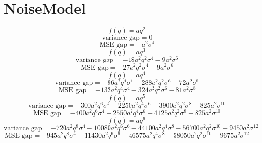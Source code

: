 \documentclass{article}
\begin{document}
\section*{NoiseModel}
\begin{dmath*}
f(q) = a q^{2}
\end{dmath*}
\begin{dmath*}
\text{variance gap} = 0
\end{dmath*}
\begin{dmath*}
\text{MSE gap} = - a^{2} \sigma^{4}
\end{dmath*}
\begin{dmath*}
f(q) = a q^{3}
\end{dmath*}
\begin{dmath*}
\text{variance gap} = - 18 a^{2} q^{2} \sigma^{4} - 9 a^{2} \sigma^{6}
\end{dmath*}
\begin{dmath*}
\text{MSE gap} = - 27 a^{2} q^{2} \sigma^{4} - 9 a^{2} \sigma^{6}
\end{dmath*}
\begin{dmath*}
f(q) = a q^{4}
\end{dmath*}
\begin{dmath*}
\text{variance gap} = - 96 a^{2} q^{4} \sigma^{4} - 288 a^{2} q^{2} \sigma^{6} - 72 a^{2} \sigma^{8}
\end{dmath*}
\begin{dmath*}
\text{MSE gap} = - 132 a^{2} q^{4} \sigma^{4} - 324 a^{2} q^{2} \sigma^{6} - 81 a^{2} \sigma^{8}
\end{dmath*}
\begin{dmath*}
f(q) = a q^{5}
\end{dmath*}
\begin{dmath*}
\text{variance gap} = - 300 a^{2} q^{6} \sigma^{4} - 2250 a^{2} q^{4} \sigma^{6} - 3900 a^{2} q^{2} \sigma^{8} - 825 a^{2} \sigma^{10}
\end{dmath*}
\begin{dmath*}
\text{MSE gap} = - 400 a^{2} q^{6} \sigma^{4} - 2550 a^{2} q^{4} \sigma^{6} - 4125 a^{2} q^{2} \sigma^{8} - 825 a^{2} \sigma^{10}
\end{dmath*}
\begin{dmath*}
f(q) = a q^{6}
\end{dmath*}
\begin{dmath*}
\text{variance gap} = - 720 a^{2} q^{8} \sigma^{4} - 10080 a^{2} q^{6} \sigma^{6} - 44100 a^{2} q^{4} \sigma^{8} - 56700 a^{2} q^{2} \sigma^{10} - 9450 a^{2} \sigma^{12}
\end{dmath*}
\begin{dmath*}
\text{MSE gap} = - 945 a^{2} q^{8} \sigma^{4} - 11430 a^{2} q^{6} \sigma^{6} - 46575 a^{2} q^{4} \sigma^{8} - 58050 a^{2} q^{2} \sigma^{10} - 9675 a^{2} \sigma^{12}
\end{dmath*}
\end{document}
